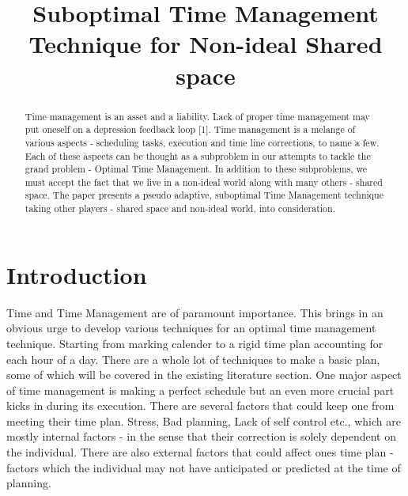 \documentclass[conference]{IEEEtran}
\begin{document}
%
\title{Suboptimal Time Management Technique for Non-ideal Shared space}


\author{
}

\maketitle


\begin{abstract}
Time management is an asset and a liability. Lack of proper time management may put oneself on a depression feedback loop [1]. Time management is a melange of various aspects - scheduling tasks, execution and time line corrections, to name a few. Each of these aspects can be thought as a subproblem in our attempts to tackle the grand problem - Optimal Time Management. In addition to these subproblems, we must accept the fact that we live in a non-ideal world along with many others - shared space.  The paper presents a pseudo adaptive, suboptimal Time Management technique taking other players - shared space and non-ideal world, into consideration.
\end{abstract}


%
\IEEEpeerreviewmaketitle


\section{Introduction}
Time and Time Management are of paramount importance. This brings in an obvious urge to develop various techniques for an optimal time management technique. Starting from marking calender to a rigid time plan accounting for each hour of a day. There are a whole lot of techniques to make a basic plan, some of which will be covered in the existing literature section. One major aspect of time management is making a perfect schedule but an even more crucial part kicks in during its execution. There are several factors that could keep one from meeting their time plan. Stress, Bad planning, Lack of self control etc., which are mostly internal factors - in the sense that their correction is solely dependent on the individual. There are also external factors that could affect ones time plan - factors which the individual may not have anticipated or predicted at the time of planning.
\end{document}
